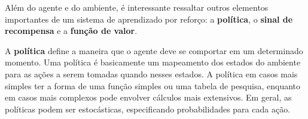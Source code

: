 

 Além do agente e do ambiente, é interessante ressaltar outros elementos importantes de um sistema de aprendizado por reforço: a \textbf{política}, o \textbf{sinal de recompensa} e a \textbf{função de valor}.

 A \textbf{política} define a maneira que o agente deve se comportar em um determinado momento. 
 Uma política é basicamente um mapeamento dos estados do ambiente para as ações a serem tomadas quando nesses estados. 
 A política em casos mais simples ter a forma de uma função simples ou uma tabela de pesquisa, enquanto em casos mais complexos pode envolver cálculos mais extensivos. 
 Em geral, as políticas podem ser estocásticas, especificando probabilidades para cada ação.

